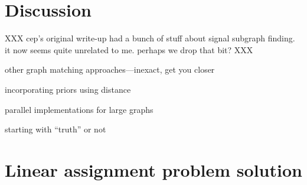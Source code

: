 
\clearpage
\section{Discussion} %
\label{sec:discussion}

XXX cep's original write-up had a bunch of stuff about signal subgraph finding.  it now seems quite unrelated to me.  perhaps we drop that bit? XXX

other graph matching approaches---inexact, get you closer

incorporating priors using distance

parallel implementations for large graphs


starting with ``truth'' or not


\clearpage
\appendix

\section{Linear assignment problem solution} %
\label{ssub:linear_assignment_problem_solution}

% 

